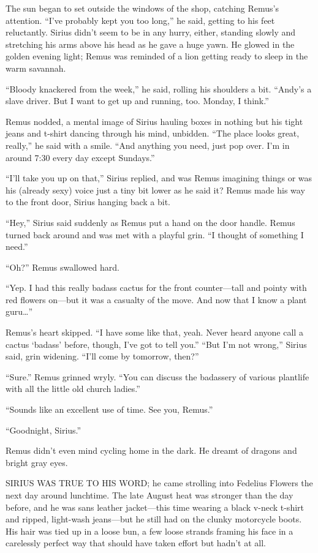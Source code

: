 The sun began to set outside the windows of the shop, catching Remus’s attention. “I’ve probably kept you too long,” he said, getting to his feet reluctantly. Sirius didn’t seem to be in any hurry, either, standing slowly and stretching his arms above his head as he gave a huge yawn. He glowed in the golden evening light; Remus was reminded of a lion getting ready to sleep in the warm savannah.

“Bloody knackered from the week,” he said, rolling his shoulders a bit. “Andy’s a slave driver. But I want to get up and running, too. Monday, I think.”

Remus nodded, a mental image of Sirius hauling boxes in nothing but his tight jeans and t-shirt dancing through his mind, unbidden. “The place looks great, really,” he said with a smile. “And anything you need, just pop over. I’m in around 7:30 every day except Sundays.”

“I’ll take you up on that,” Sirius replied, and was Remus imagining things or was his (already sexy) voice just a tiny bit lower as he said it? Remus made his way to the front door, Sirius hanging back a bit.

“Hey,” Sirius said suddenly as Remus put a hand on the door handle. Remus turned back around and was met with a playful grin. “I thought of something I need.”

“Oh?” Remus swallowed hard.

“Yep. I had this really badass cactus for the front counter—tall and pointy with red flowers on—but it was a casualty of the move. And now that I know a plant guru…”

Remus’s heart skipped. “I have some like that, yeah. Never heard anyone call a cactus ‘badass’ before, though, I’ve got to tell you.”
“But I’m not wrong,” Sirius said, grin widening. “I’ll come by tomorrow, then?”

“Sure.” Remus grinned wryly. “You can discuss the badassery of various plantlife with all the little old church ladies.”

“Sounds like an excellent use of time. See you, Remus.”

“Goodnight, Sirius.”

Remus didn’t even mind cycling home in the dark. He dreamt of dragons and bright gray eyes.

\newpage

SIRIUS WAS TRUE TO HIS WORD; he came strolling into Fedelius Flowers the next day around lunchtime. The late August heat was stronger than the day before, and he was sans leather jacket—this time wearing a black v-neck t-shirt and ripped, light-wash jeans—but he still had on the clunky motorcycle boots. His hair was tied up in a loose bun, a few loose strands framing his face in a carelessly perfect way that should have taken effort but hadn’t at all.

